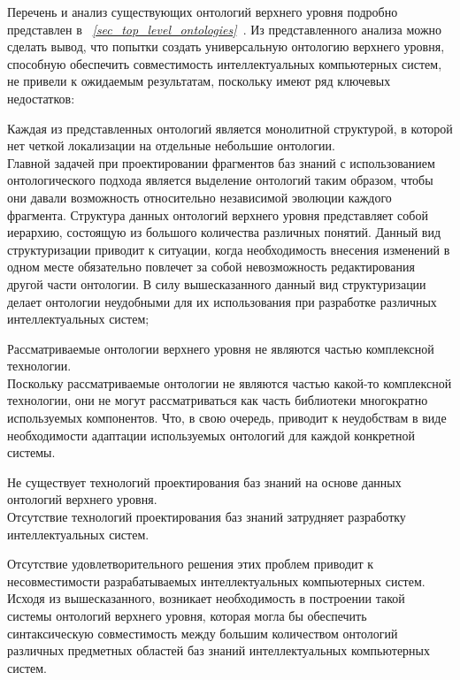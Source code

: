 Перечень и анализ существующих онтологий верхнего уровня подробно представлен в \textit{~\ref{sec_top_level_ontologies}~}. Из представленного анализа можно сделать вывод, что попытки создать универсальную онтологию верхнего уровня, способную обеспечить совместимость интеллектуальных компьютерных систем, не привели к ожидаемым результатам, поскольку имеют ряд ключевых недостатков:
\begin{textitemize}
	\item Каждая из представленных онтологий является монолитной структурой, в которой нет четкой локализации на отдельные небольшие онтологии. \\
	Главной задачей при проектировании фрагментов баз знаний с использованием онтологического подхода является выделение онтологий таким образом, чтобы они давали возможность относительно независимой эволюции каждого фрагмента. Структура данных онтологий верхнего уровня представляет собой иерархию, состоящую из большого количества различных понятий. Данный вид структуризации приводит к ситуации, когда необходимость внесения изменений в одном месте обязательно повлечет за собой невозможность редактирования другой части онтологии. В силу вышесказанного данный вид структуризации делает онтологии неудобными для их использования при разработке различных интеллектуальных систем;
	\item Рассматриваемые онтологии верхнего уровня не являются частью комплексной технологии.\\
	Поскольку рассматриваемые онтологии не являются частью какой-то комплексной технологии, они не могут рассматриваться как часть библиотеки многократно используемых компонентов. Что, в свою очередь, приводит к неудобствам в виде необходимости адаптации используемых онтологий для каждой конкретной системы.
	\item Не существует технологий проектирования баз знаний на основе данных онтологий верхнего уровня.\\
	Отсутствие технологий проектирования баз знаний затрудняет разработку интеллектуальных систем. 
\end{textitemize}

Отсутствие удовлетворительного решения этих проблем приводит к несовместимости разрабатываемых интеллектуальных компьютерных систем. Исходя из вышесказанного, возникает необходимость в построении такой системы онтологий верхнего уровня, которая могла бы обеспечить синтаксическую совместимость между большим количеством онтологий различных предметных областей баз знаний интеллектуальных компьютерных систем. 

